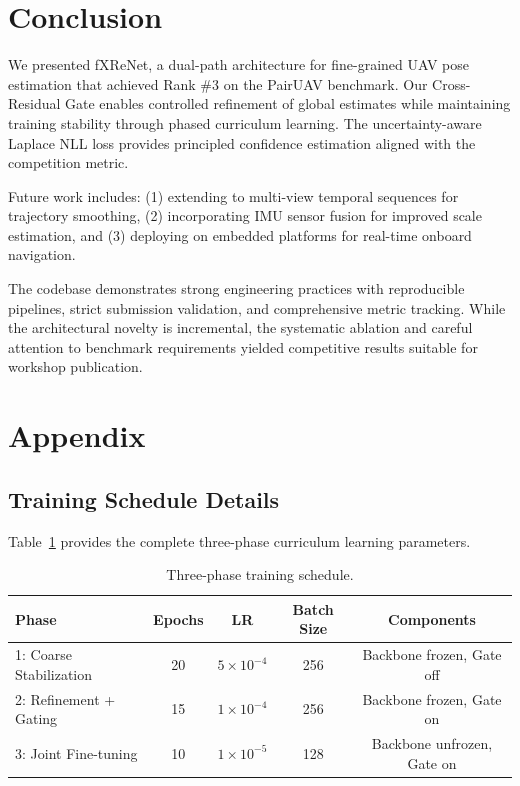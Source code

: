 \documentclass[sigconf,nonacm]{acmart}
\begin{document}
\section{Conclusion}

We presented fXReNet, a dual-path architecture for fine-grained UAV pose estimation that achieved Rank \#3 on the PairUAV benchmark. Our Cross-Residual Gate enables controlled refinement of global estimates while maintaining training stability through phased curriculum learning. The uncertainty-aware Laplace NLL loss provides principled confidence estimation aligned with the competition metric.

Future work includes: (1) extending to multi-view temporal sequences for trajectory smoothing, (2) incorporating IMU sensor fusion for improved scale estimation, and (3) deploying on embedded platforms for real-time onboard navigation.

The codebase demonstrates strong engineering practices with reproducible pipelines, strict submission validation, and comprehensive metric tracking. While the architectural novelty is incremental, the systematic ablation and careful attention to benchmark requirements yielded competitive results suitable for workshop publication.




\appendix
\section{Appendix}\label{sec:appendix}

\subsection{Training Schedule Details}

Table~\ref{tab:training_phases} provides the complete three-phase curriculum learning parameters.

\begin{table}[H]
\centering
\caption{Three-phase training schedule.}
\label{tab:training_phases}
\begin{tabular}{lcccc}
\toprule
Phase & Epochs & LR & Batch Size & Components \\
\midrule
1: Coarse Stabilization & 20 & $5 \times 10^{-4}$ & 256 & Backbone frozen, Gate off \\
2: Refinement + Gating & 15 & $1 \times 10^{-4}$ & 256 & Backbone frozen, Gate on \\
3: Joint Fine-tuning & 10 & $1 \times 10^{-5}$ & 128 & Backbone unfrozen, Gate on \\
\bottomrule
\end{tabular}
\end{table}
\end{document}
